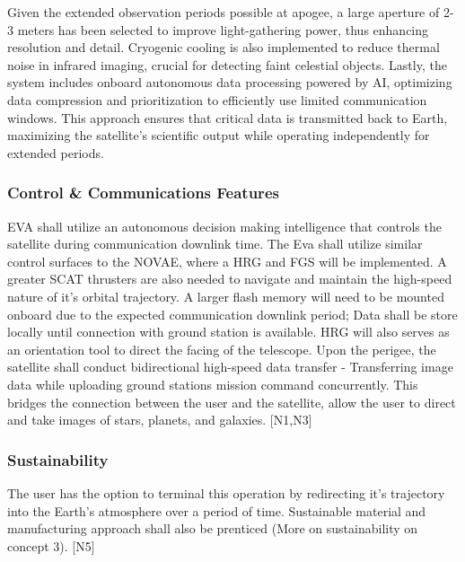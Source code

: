 \vspace{1.5mm}

Given the extended observation periods possible at apogee, a large aperture of 2-3 meters has been selected to improve light-gathering power, thus enhancing resolution and detail. Cryogenic cooling is also implemented to reduce thermal noise in infrared imaging, crucial for detecting faint celestial objects. Lastly, the system includes onboard autonomous data processing powered by AI, optimizing data compression and prioritization to efficiently use limited communication windows. This approach ensures that critical data is transmitted back to Earth, maximizing the satellite’s scientific output while operating independently for extended periods.


\vspace{1.5mm}

\subsubsection{Control \& Communications Features}
EVA shall utilize an autonomous decision making intelligence that controls the satellite during communication downlink time. The Eva shall utilize similar control surfaces to the NOVAE, where a HRG and FGS will be implemented. A greater SCAT thrusters are also needed to navigate and maintain the high-speed nature of it's orbital trajectory. A larger flash memory will need to be mounted onboard due to the expected communication downlink period; Data shall be store locally until connection with ground station is available.  HRG will also serves as an orientation tool to direct the facing of the telescope. Upon the perigee, the satellite shall conduct bidirectional high-speed data transfer - Transferring image data while uploading ground stations mission command concurrently. This bridges the connection between the user and the satellite, allow the user to direct and take images of stars, planets, and galaxies. [N1,N3]

\subsubsection{Sustainability}
The user has the option to terminal this operation by redirecting it's trajectory into the Earth's atmosphere over a period of time. Sustainable material and manufacturing approach shall also be prenticed (More on sustainability on concept 3). [N5]
